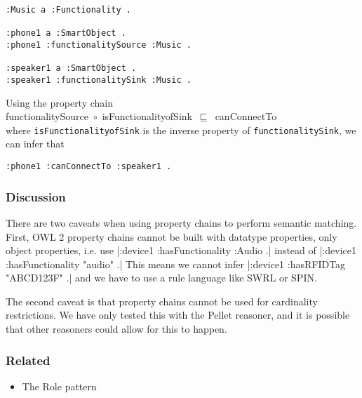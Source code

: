 \begin{verbatim}               
:Music a :Functionality .

:phone1 a :SmartObject .
:phone1 :functionalitySource :Music . 
              
:speaker1 a :SmartObject .
:speaker1 :functionalitySink :Music . 
\end{verbatim}

Using the property chain\\

\noindent
functionalitySource~\ensuremath{\circ}~isFunctionalityofSink~\ensuremath{\sqsubseteq}~canConnectTo\\

where \texttt{isFunctionalityofSink} is the inverse property of \texttt{functionalitySink}, we can infer that

\begin{verbatim}               
:phone1 :canConnectTo :speaker1 .
\end{verbatim}


\subsubsection{Discussion}

There are two caveats when using property chains to perform semantic matching. First, \ac{OWL} 2 property chains cannot be built with datatype properties, only object properties, i.e. use |:device1 :hasFunctionality :Audio .| instead of |:device1 :hasFunctionality "audio" .| This means we cannot infer |:device1 :hasRFIDTag "ABCD123F" .| and we have to use a rule language like \ac{SWRL} or \ac{SPIN}.

The second caveat is that property chains cannot be used for cardinality restrictions. We have only tested this with the Pellet reasoner, and it is possible that other reasoners could allow for this to happen.

\subsubsection{Related}

\begin{itemize}
	\item The Role pattern
\end{itemize}




